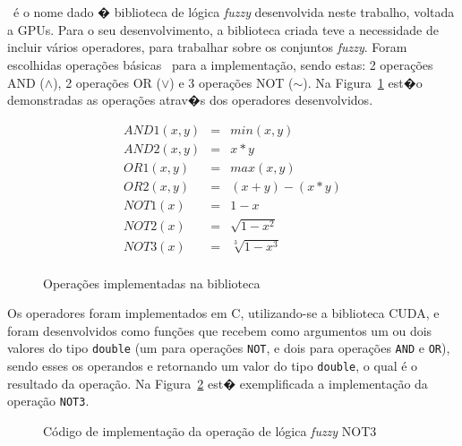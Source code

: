 \documentclass[12pt]{article}
\begin{document}
{\section{\libname}
\label{sec:lib}

	\libname~é o nome dado � biblioteca de lógica \textit{fuzzy} desenvolvida neste trabalho, voltada a GPUs. Para o seu desenvolvimento, a biblioteca criada teve a necessidade de incluir vários operadores, para trabalhar sobre os conjuntos \textit{fuzzy}. Foram escolhidas operações básicas~\cite{klir:95} para a implementação, sendo estas: 2 operações AND ($\wedge$), 2 operações OR ($\vee$) e 3 operações NOT ($\sim$). Na Figura~\ref{fig:fuzzyops} est�o demonstradas as operações atrav�s dos operadores desenvolvidos.
	
\begin{figure}[!h]
\centering

\[ \begin{array}{ccc}
	AND1(x, y) & = & min(x, y) \\
	AND2(x, y) & = & x * y \\
	OR1(x, y) & = & max(x, y) \\
	OR2(x, y) & = & (x + y) - (x * y)\\
	NOT1(x) & = & 1 - x \\
	NOT2(x) & = & \sqrt{1-x^2} \\
	NOT3(x) & = & \sqrt[3]{1-x^3} \\
\end{array} \]
\caption{Operações implementadas na biblioteca~\libname}
\label{fig:fuzzyops}
\end{figure}


Os operadores foram implementados em C, utilizando-se a biblioteca CUDA, e foram desenvolvidos como funções que recebem como argumentos um ou dois valores do tipo \texttt{double} (um para operações \texttt{NOT}, e dois para operações \texttt{AND} e \texttt{OR}), sendo esses os operandos e retornando um valor do tipo \texttt{double}, o qual é o resultado da operação. Na Figura~\ref{fig:operation} est� exemplificada a implementação da operação \texttt{NOT3}.

\begin{figure}[!h]
\centering

\caption{Código de implementação da operação de lógica \textit{fuzzy} NOT3}
\label{fig:operation}
\end{figure}

}
\end{document}
